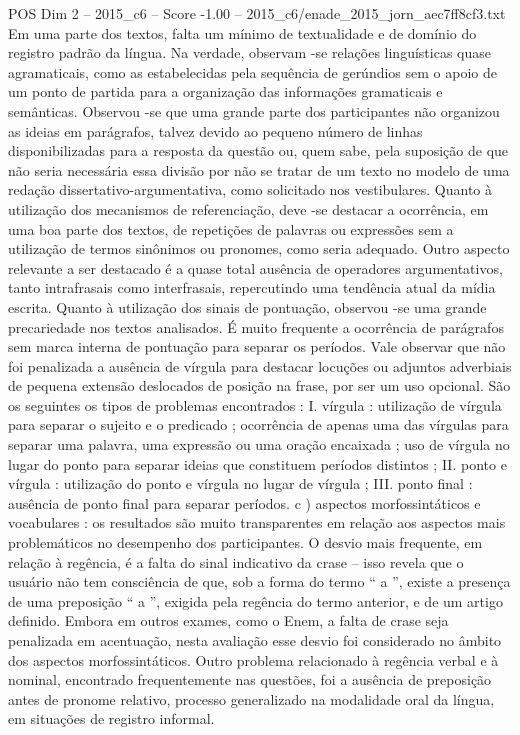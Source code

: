 \begin{textsample}{POS Dim 2 – 2015\_c6 – Score -1.00 – 2015\_c6/enade\_2015\_jorn\_aec7ff8cf3.txt}
Em uma parte dos textos, falta um mínimo de textualidade e de domínio do registro padrão da língua.
Na verdade, observam -se relações linguísticas quase agramaticais, como as estabelecidas pela sequência de gerúndios sem o apoio de um ponto de partida para a organização das informações gramaticais e semânticas.
Observou -se que uma grande parte dos participantes não organizou as ideias em parágrafos, talvez devido ao pequeno número de linhas disponibilizadas para a resposta da questão ou, quem sabe, pela suposição de que não seria necessária essa divisão por não se tratar de um texto no modelo de uma redação dissertativo-argumentativa, como solicitado nos vestibulares.
Quanto à utilização dos mecanismos de referenciação, deve -se destacar a ocorrência, em uma boa parte dos textos, de repetições de palavras ou expressões sem a utilização de termos sinônimos ou pronomes, como seria adequado.
Outro aspecto relevante a ser destacado é a quase total ausência de operadores argumentativos, tanto intrafrasais como interfrasais, repercutindo uma tendência atual da mídia escrita.
Quanto à utilização dos sinais de pontuação, observou -se uma grande precariedade nos textos analisados.
É muito frequente a ocorrência de parágrafos sem marca interna de pontuação para separar os períodos.
Vale observar que não foi penalizada a ausência de vírgula para destacar locuções ou adjuntos adverbiais de pequena extensão deslocados de posição na frase, por ser um uso opcional.
São os seguintes os tipos de problemas encontrados : I. vírgula : utilização de vírgula para separar o sujeito e o predicado ; ocorrência de apenas uma das vírgulas para separar uma palavra, uma expressão ou uma oração encaixada ; uso de vírgula no lugar do ponto para separar ideias que constituem períodos distintos ; II. ponto e vírgula : utilização do ponto e vírgula no lugar de vírgula ; III. ponto final : ausência de ponto final para separar períodos. c ) aspectos morfossintáticos e vocabulares : os resultados são muito transparentes em relação aos aspectos mais problemáticos no desempenho dos participantes.
O desvio mais frequente, em relação à regência, é a falta do sinal indicativo da crase – isso revela que o usuário não tem consciência de que, sob a forma do termo “ a ”, existe a presença de uma preposição “ a ”, exigida pela regência do termo anterior, e de um artigo definido.
Embora em outros exames, como o Enem, a falta de crase seja penalizada em acentuação, nesta avaliação esse desvio foi considerado no âmbito dos aspectos morfossintáticos.
Outro problema relacionado à regência verbal e à nominal, encontrado frequentemente nas questões, foi a ausência de preposição antes de pronome relativo, processo generalizado na modalidade oral da língua, em situações de registro informal.

\end{textsample}
